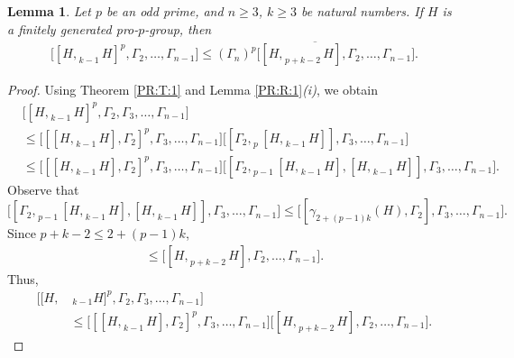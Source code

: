 \documentclass[12pt]{elsarticle}
\newtheorem{lemma}[theorem]{Lemma}
\newtheorem*{main corollary*}{Main Corollary}
\theoremstyle{definition}
\begin{document}
\begin{lemma}\label{Lemma Derived series 2}
Let $p$ be an odd prime, and $n\geq 3$, $k\geq 3$ be natural numbers. If $H$ is a finitely generated pro-$p$-group, then 
 \begin{align*}
     \bigl[[H,_{\;k-1}H]^p,\Gamma_2,\ldots,\Gamma_{n-1}\bigr]
        \leqslant \overline{(\Gamma_n)^p\bigl[[H,_{\;p+k-2}H],\Gamma_2,\ldots,\Gamma_{n-1}\bigr]}.
 \end{align*}
    
\end{lemma}
\begin{proof}
    Using Theorem \ref{PR:T:1} and Lemma \ref{PR:R:1}\textit{(i)}, we obtain 
    \begin{align*}
        &\bigl[[H,_{\;k-1}H]^p,\Gamma_2,\Gamma_3,\dots,\Gamma_{n-1}\bigr]\\
        &\leqslant  \bigl[[[H,_{\;k-1}H],\Gamma_2]^p,\Gamma_3,\dots,\Gamma_{n-1}\bigr]\bigl[[\Gamma_2, _{\;p}[H,_{\;k-1}H]],\Gamma_3,\dots,\Gamma_{n-1}\bigr]\nonumber\\
        &\leqslant \bigl[[[H,_{\;k-1}H],\Gamma_2]^p,\Gamma_3,\dots,\Gamma_{n-1}\bigr] \bigl[[\Gamma_2, _{\;p-1}[H,_{\;k-1}H], [H,_{\;k-1}H]],\Gamma_3,\dots,\Gamma_{n-1}\bigr].    
    \end{align*}
     Observe that \[\bigl[[\Gamma_2, _{\;p-1}[H,_{\;k-1}H], [H,_{\;k-1}H]],\Gamma_3,\dots,\Gamma_{n-1}\bigr]\leqslant \bigl[[\gamma_{2+(p-1)k}(H),\Gamma_2],\Gamma_3,\dots,\Gamma_{n-1}\bigr].\]
     Since $p+k-2 \leq 2+(p-1)k$, 
     \begin{align*}
     [\gamma_{2+(p-1)k}(H),\Gamma_2,\Gamma_3,\dots,\Gamma_{n-1}]\leqslant \bigl[[H,_{\;p+k-2}H],\Gamma_2,\ldots,\Gamma_{n-1}\bigr].
     \end{align*}Thus,
     \begin{align}
        \bigl[[H,&_{\;k-1}H]^p,\Gamma_2,\Gamma_3,\dots,\Gamma_{n-1}\bigr]\nonumber\\
        &\leqslant  \bigl[[[H,_{\;k-1}H],\Gamma_2]^p,\Gamma_3,\dots,\Gamma_{n-1}\bigr]\bigl[[H,_{\;p+k-2}H],\Gamma_2,\ldots,\Gamma_{n-1}\bigr].\label{Derived series Lemma step 1}\end{align}
 

\end{proof}
\end{document}
